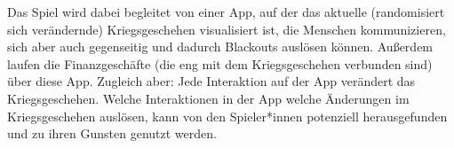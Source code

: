 Das Spiel wird dabei begleitet von einer App, auf der das aktuelle
(randomisiert sich verändernde) Kriegsgeschehen visualisiert ist, die Menschen
kommunizieren, sich aber auch gegenseitig  und dadurch Blackouts
auslösen können. 
Außerdem laufen die Finanzgeschäfte (die eng mit dem Kriegsgeschehen verbunden
sind) über diese App. Zugleich aber: Jede Interaktion auf der App verändert das
Kriegsgeschehen.
Welche Interaktionen in der App welche Änderungen im Kriegsgeschehen auslösen,
kann von den Spieler*innen potenziell herausgefunden und zu ihren Gunsten
genutzt werden.
